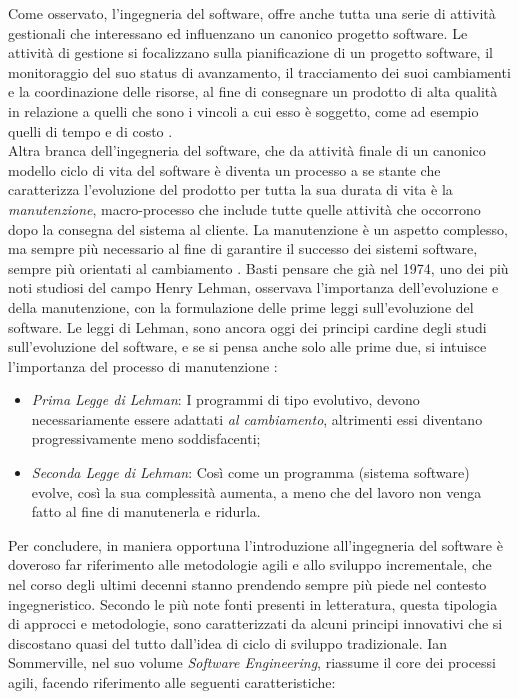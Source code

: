 Come osservato, l'ingegneria del software, offre anche tutta una serie di attività gestionali che interessano ed influenzano un canonico progetto software.  Le attività di gestione si focalizzano sulla pianificazione di un progetto software, il monitoraggio del suo status di avanzamento, il tracciamento dei suoi cambiamenti e la coordinazione delle risorse, al fine di consegnare un prodotto di alta qualità in relazione a quelli che sono i vincoli a cui esso è soggetto, come ad esempio quelli di tempo e di costo \cite{Bruegge2009ObjectOrientedSE}. \\

Altra branca dell'ingegneria del software, che da attività finale di un canonico modello ciclo di vita del software è diventa un processo a se stante che caratterizza l'evoluzione del prodotto per tutta la sua durata di vita è la \emph{manutenzione}, macro-processo che include tutte quelle attività che occorrono dopo la consegna del sistema al cliente. La manutenzione è un aspetto complesso, ma sempre più necessario al fine di garantire il successo dei sistemi software, sempre più orientati al cambiamento \cite{Bruegge2009ObjectOrientedSE}. Basti pensare che già nel 1974, uno dei più noti studiosi del campo Henry Lehman, osservava l'importanza dell'evoluzione e della manutenzione, con la formulazione delle prime leggi sull'evoluzione del software. Le leggi di Lehman, sono ancora oggi dei principi cardine degli studi sull'evoluzione del software, e se si pensa anche solo alle prime due, si intuisce l'importanza del processo di manutenzione \cite{SEMaintenance} :

\begin{itemize}
    \item \emph{Prima Legge di Lehman}: I programmi di tipo evolutivo, devono necessariamente essere adattati \emph{al cambiamento}, altrimenti essi diventano progressivamente meno soddisfacenti;
    \item \emph{Seconda Legge di Lehman}: Così come un programma (sistema software) evolve, così la sua complessità aumenta, a meno che del lavoro non venga fatto al fine di manutenerla e ridurla.
\end{itemize}

Per concludere, in maniera opportuna l'introduzione all'ingegneria del software è doveroso far riferimento alle metodologie agili e allo sviluppo incrementale, che nel corso degli ultimi decenni stanno prendendo sempre più piede nel contesto ingegneristico. Secondo le più note fonti presenti in letteratura, questa tipologia di approcci e metodologie, sono caratterizzati da alcuni principi innovativi che si discostano quasi del tutto dall'idea di ciclo di sviluppo tradizionale. Ian Sommerville, nel suo volume \emph{Software Engineering}, riassume il core dei processi agili, facendo riferimento alle seguenti caratteristiche\cite{Sommerville10}:

